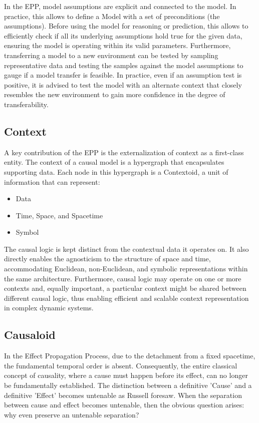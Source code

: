  In the EPP, model assumptions are explicit and connected to the model.  In practice, this allows to define a Model with a set of preconditions (the
  assumptions). Before using the model for reasoning or prediction, this allows to efficiently check if all its underlying
  assumptions hold true for the given data, ensuring the model is operating within its  valid parameters. Furthermore, transferring a model to a new environment can be
  tested by sampling representative data and testing the samples against the model assumptions to gauge if a model transfer is feasible. In practice, even if an assumption test is positive, it is advised to test the model with an alternate context that closely resembles the new environment to gain more confidence in the degree of transferability. 
 
%
%
\subsection{Context}
\label{sec:epp_context}

A key contribution of the EPP is the externalization of context as a first-class entity.
The context of a causal model is a hypergraph that encapsulates supporting data. 
Each node in this hypergraph is a Contextoid, a unit of information that can represent:

\begin{itemize}
	\item Data
	\item Time, Space, and Spacetime
	\item Symbol 
\end{itemize}

The causal logic is kept distinct from the contextual data it operates on. It also directly enables the  agnosticism to the structure of space and time, accommodating Euclidean, non-Euclidean, and symbolic representations within the same architecture. Furthermore,  causal logic  may operate on one or more contexts and, equally important, a particular context might be shared between different causal logic, thus enabling efficient and scalable context representation in complex dynamic systems. 

%
%
\subsection{Causaloid}
\label{sec:epp_causaloid}

In the Effect Propagation Process, due to the detachment from a fixed spacetime, the fundamental temporal order is absent. Consequently, the entire classical concept of causality, where a cause must happen before its effect, can no longer be fundamentally established. The distinction between a definitive 'Cause' and a definitive 'Effect' becomes untenable as Russell foresaw. When the separation between cause and effect becomes untenable, then the obvious question arises: why even preserve an untenable separation?

